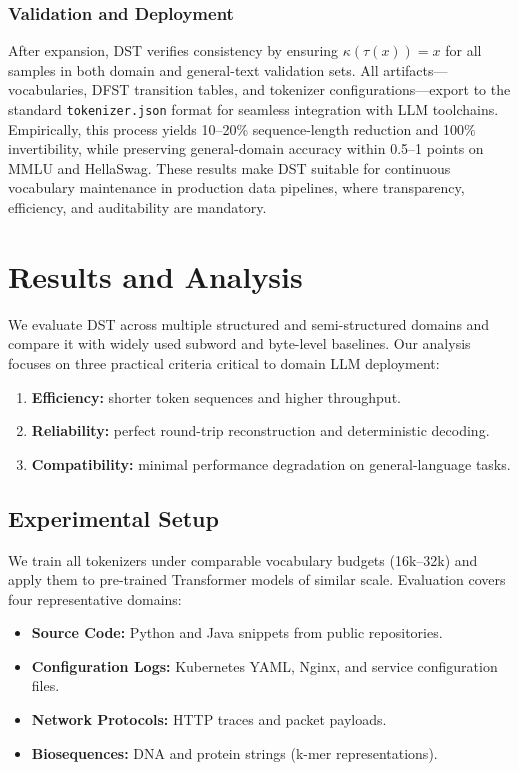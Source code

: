 \subsubsection{Validation and Deployment}

After expansion, DST verifies consistency by ensuring $\kappa(\tau(x))=x$ for all samples in both domain and general-text validation sets.
All artifacts—vocabularies, DFST transition tables, and tokenizer configurations—export to the standard \texttt{tokenizer.json} format for seamless integration with LLM toolchains.
Empirically, this process yields 10–20\% sequence-length reduction and 100\% invertibility, while preserving general-domain accuracy within 0.5–1 points on MMLU and HellaSwag.
These results make DST suitable for continuous vocabulary maintenance in production data pipelines, where transparency, efficiency, and auditability are mandatory.

\section{Results and Analysis}
\label{sec:results}

We evaluate DST across multiple structured and semi-structured domains and compare it with widely used subword and byte-level baselines.
Our analysis focuses on three practical criteria critical to domain LLM deployment:

\begin{enumerate}
    \item \textbf{Efficiency:} shorter token sequences and higher throughput.
    \item \textbf{Reliability:} perfect round-trip reconstruction and deterministic decoding.
    \item \textbf{Compatibility:} minimal performance degradation on general-language tasks.
\end{enumerate}

\subsection{Experimental Setup}

We train all tokenizers under comparable vocabulary budgets (16k–32k) and apply them to pre-trained Transformer models of similar scale.
Evaluation covers four representative domains:

\begin{itemize}
    \item \textbf{Source Code:} Python and Java snippets from public repositories.
    \item \textbf{Configuration Logs:} Kubernetes YAML, Nginx, and service configuration files.
    \item \textbf{Network Protocols:} HTTP traces and packet payloads.
    \item \textbf{Biosequences:} DNA and protein strings (k-mer representations).
\end{itemize}

